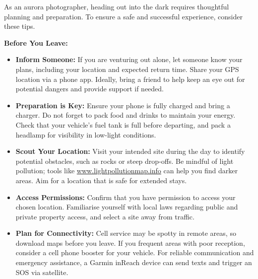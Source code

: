 \documentclass{article}
\begin{document}
As an aurora photographer, heading out into the dark requires thoughtful planning and preparation. To ensure a safe and successful experience, consider these tips.

\noindent\newline\textbf{Before You Leave:}
\begin{itemize}
    \item \textbf{Inform Someone:} If you are venturing out alone, let someone know your plans, including your location and expected return time. Share your GPS location via a phone app. Ideally, bring a friend to help keep an eye out for potential dangers and provide support if needed.
    \item \textbf{Preparation is Key:} Ensure your phone is fully charged and bring a charger. Do not forget to pack food and drinks to maintain your energy. Check that your vehicle’s fuel tank is full before departing, and pack a headlamp for visibility in low-light conditions.
    \item \textbf{Scout Your Location:} Visit your intended site during the day to identify potential obstacles, such as rocks or steep drop-offs. Be mindful of light pollution; tools like \url{www.lightpollutionmap.info} can help you find darker areas. Aim for a location that is safe for extended stays.
    \item \textbf{Access Permissions:} Confirm that you have permission to access your chosen location. Familiarise yourself with local laws regarding public and private property access, and select a site away from traffic.
    \item \textbf{Plan for Connectivity:} Cell service may be spotty in remote areas, so download maps before you leave. If you frequent areas with poor reception, consider a cell phone booster for your vehicle. For reliable communication and emergency assistance, a Garmin inReach device can send texts and trigger an SOS via satellite.
\end{itemize}
\end{document}
